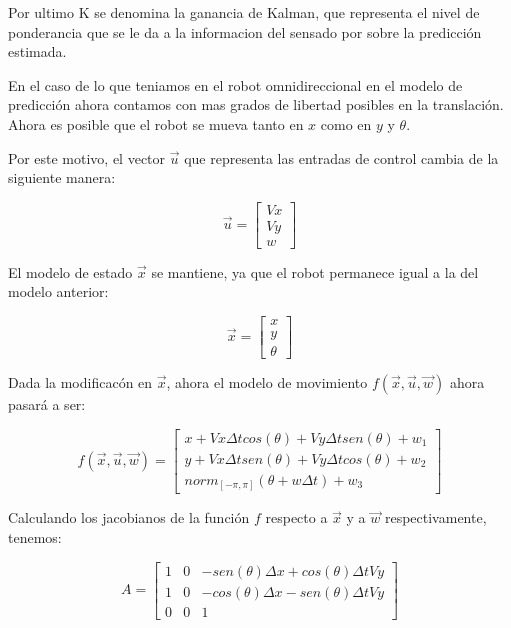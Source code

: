 Por ultimo K se denomina la ganancia de Kalman, que representa el nivel de ponderancia que se le da a la informacion del sensado por sobre la predicción estimada.

En el caso de lo que teniamos en el robot omnidireccional en el modelo de predicción ahora contamos con mas grados de libertad posibles en la translación. Ahora es posible que el robot se mueva tanto en $x$ como en $y$ y $\theta$.

Por este motivo, el vector $\overrightarrow{u}$ que representa las entradas de control cambia de la siguiente manera:

$$\overrightarrow{u} = \begin{bmatrix}
         Vx \\
         Vy \\
         w 
        \end{bmatrix}$$


El modelo de estado $\overrightarrow{x}$ se mantiene, ya que el robot permanece igual a la del modelo anterior:

$$\overrightarrow{x} = \begin{bmatrix}
         x \\
         y \\
         \theta 
        \end{bmatrix}$$

Dada la modificacón en $\overrightarrow{x}$, ahora el modelo de movimiento $f(\overrightarrow{x},\overrightarrow{u}, \overrightarrow{w})$ ahora pasará a ser:

$$f(\overrightarrow{x},\overrightarrow{u}, \overrightarrow{w})= \begin{bmatrix}
         x + Vx \Delta t cos(\theta) + Vy \Delta t sen(\theta) + w_1 \\
         y + Vx \Delta t sen(\theta) + Vy \Delta t cos(\theta) + w_2 \\
         norm_{[-\pi,\pi]} (\theta + w \Delta t) + w_3
         \end{bmatrix}$$

Calculando los jacobianos de la función $f$ respecto a $\overrightarrow{x}$ y a $\overrightarrow{w}$ respectivamente, tenemos:

$$A= \begin{bmatrix}
         1 & 0 & -sen(\theta)\Delta x + cos(\theta) \Delta t V y\\
         1 & 0 & -cos(\theta)\Delta x - sen(\theta) \Delta t V y \\
         0 & 0 & 1
         \end{bmatrix}$$

